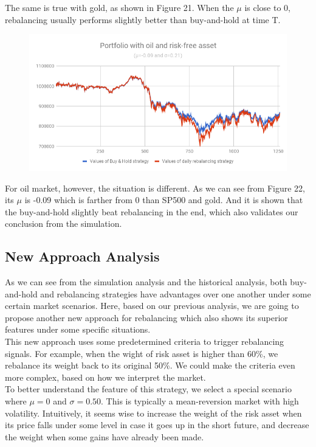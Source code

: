\documentclass[
10pt, %
a4paper, %
oneside, %
headinclude,footinclude, %
BCOR5mm, %
]{scrartcl}
\begin{document}
The same is true with gold, as shown in Figure 21. When the $\mu$ is close to 0, rebalancing usually performs slightly better than buy-and-hold at time T.\\

\begin{figure}[H]
	\centering
	\includegraphics[width=0.7\linewidth]{oil}
	\caption{}
	\label{fig:oil}
\end{figure}

For oil market, however, the situation is different. As we can see from Figure 22, its $\mu$ is -0.09 which is farther from 0 than SP500 and gold. And it is shown that the buy-and-hold slightly beat rebalancing in the end, which also validates our conclusion from the simulation.

\subsection{New Approach Analysis}
As we can see from the simulation analysis and the historical analysis, both buy-and-hold and rebalancing strategies have advantages over one another under some certain market scenarios. Here, based on our previous analysis, we are going to propose another new approach for rebalancing which also shows its superior features under some specific situations.\\

This new approach uses some predetermined criteria to trigger rebalancing signals. For example, when the wight of risk asset is higher than 60\%, we rebalance its weight back to its original 50\%. We could make the criteria even more complex, based on how we interpret the market.\\

To better understand the feature of this strategy, we select a special scenario where $\mu = 0$ and $\sigma = 0.50$. This is typically a mean-reversion market with high volatility. Intuitively, it seems wise to increase the weight of the risk asset when its price falls under some level in case it goes up in the short future, and decrease the weight when some gains have already been made. \\
\end{document}
